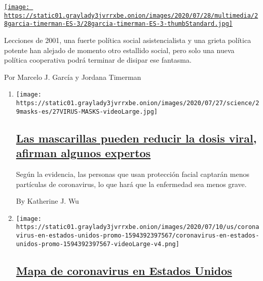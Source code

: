 \begin{enumerate}
\begin{enumerate}
    \href{/es/2020/07/28/espanol/opinion/argentina-estallido-2001-coronavirus.html}{\texttt{[image: https://static01.graylady3jvrrxbe.onion/images/2020/07/28/multimedia/28garcia-timerman-ES-3/28garcia-timerman-ES-3-thumbStandard.jpg]}}

    Lecciones de 2001, una fuerte política social asistencialista y una
    grieta política potente han alejado de momento otro estallido
    social, pero solo una nueva política cooperativa podrá terminar de
    disipar ese fantasma.

    Por Marcelo J. García y Jordana Timerman
  \end{enumerate}
\end{enumerate}

\begin{enumerate}
\def\labelenumi{\arabic{enumi}.}
\item
  \texttt{[image: https://static01.graylady3jvrrxbe.onion/images/2020/07/27/science/29masks-es/27VIRUS-MASKS-videoLarge.jpg]}

  \hypertarget{las-mascarillas-pueden-reducir-la-dosis-viral-afirman-algunos-expertos}{%
  \subsection{\texorpdfstring{\href{/es/2020/07/29/espanol/ciencia-y-tecnologia/proteccion-cubrebocas-coronavirus.html}{Las
  mascarillas pueden reducir la dosis viral, afirman algunos
  expertos}}{Las mascarillas pueden reducir la dosis viral, afirman algunos expertos}}\label{las-mascarillas-pueden-reducir-la-dosis-viral-afirman-algunos-expertos}}

  Según la evidencia, las personas que usan protección facial captarán
  menos partículas de coronavirus, lo que hará que la enfermedad sea
  menos grave.

  By Katherine J. Wu
\item
  \texttt{[image: https://static01.graylady3jvrrxbe.onion/images/2020/07/10/us/coronavirus-en-estados-unidos-promo-1594392397567/coronavirus-en-estados-unidos-promo-1594392397567-videoLarge-v4.png]}

  \hypertarget{mapa-de-coronavirus-en-estados-unidos}{%
  \subsection{\texorpdfstring{\href{/es/interactive/2020/espanol/mundo/coronavirus-en-estados-unidos.html}{Mapa
  de coronavirus en Estados
  Unidos}}{Mapa de coronavirus en Estados Unidos}}\label{mapa-de-coronavirus-en-estados-unidos}}


\end{enumerate}
